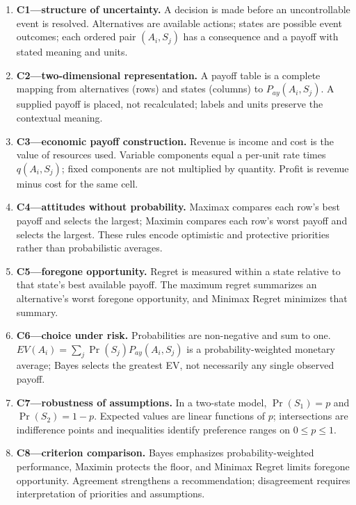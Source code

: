 \documentclass[10pt,letterpaper]{article}
\begin{document}
	\vspace{0.20in}
	\begin{bluebox}
		\fontsize{8.7}{11}\selectfont
		\begin{enumerate}[leftmargin=2em,itemsep=4pt]
			\item \textbf{C1---structure of uncertainty.} A decision is made before an uncontrollable event is resolved. Alternatives are available actions; states are possible event outcomes; each ordered pair $(A_i,S_j)$ has a consequence and a payoff with stated meaning and units.
			\item \textbf{C2---two-dimensional representation.} A payoff table is a complete mapping from alternatives (rows) and states (columns) to $P_{ay}(A_i,S_j)$. A supplied payoff is placed, not recalculated; labels and units preserve the contextual meaning.
			\item \textbf{C3---economic payoff construction.} Revenue is income and cost is the value of resources used. Variable components equal a per-unit rate times $q(A_i,S_j)$; fixed components are not multiplied by quantity. Profit is revenue minus cost for the same cell.
			\item \textbf{C4---attitudes without probability.} Maximax compares each row's best payoff and selects the largest; Maximin compares each row's worst payoff and selects the largest. These rules encode optimistic and protective priorities rather than probabilistic averages.
			\item \textbf{C5---foregone opportunity.} Regret is measured within a state relative to that state's best available payoff. The maximum regret summarizes an alternative's worst foregone opportunity, and Minimax Regret minimizes that summary.
			\item \textbf{C6---choice under risk.} Probabilities are non-negative and sum to one. $EV(A_i)=\sum_j\Pr(S_j)P_{ay}(A_i,S_j)$ is a probability-weighted monetary average; Bayes selects the greatest EV, not necessarily any single observed payoff.
			\item \textbf{C7---robustness of assumptions.} In a two-state model, $\Pr(S_1)=p$ and $\Pr(S_2)=1-p$. Expected values are linear functions of $p$; intersections are indifference points and inequalities identify preference ranges on $0\leq p\leq1$.
			\item \textbf{C8---criterion comparison.} Bayes emphasizes probability-weighted performance, Maximin protects the floor, and Minimax Regret limits foregone opportunity. Agreement strengthens a recommendation; disagreement requires interpretation of priorities and assumptions.

\end{enumerate}
\end{bluebox}
\end{document}
